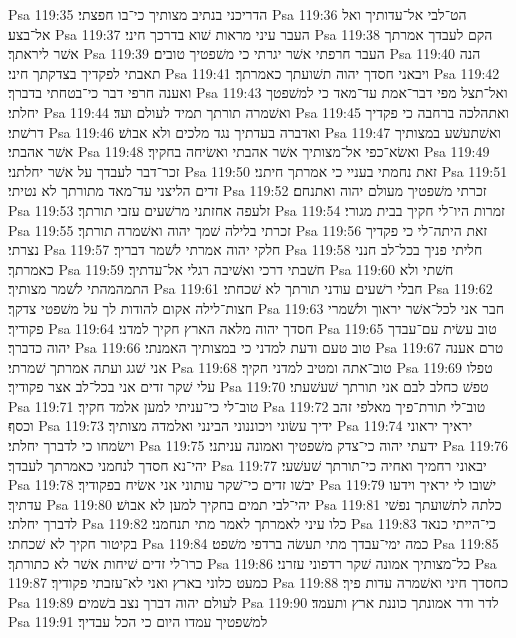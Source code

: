Psa 119:35  הדריכני בנתיב מצותיך כי־בו חפצתי׃
Psa 119:36  הט־לבי אל־עדותיך ואל אל־בצע׃
Psa 119:37  העבר עיני מראות שׁוא בדרכך חיני׃
Psa 119:38  הקם לעבדך אמרתך אשׁר ליראתך׃
Psa 119:39  העבר חרפתי אשׁר יגרתי כי משׁפטיך טובים׃
Psa 119:40  הנה תאבתי לפקדיך בצדקתך חיני׃
Psa 119:41  ויבאני חסדך יהוה תשׁועתך כאמרתך׃
Psa 119:42  ואענה חרפי דבר כי־בטחתי בדברך׃
Psa 119:43  ואל־תצל מפי דבר־אמת עד־מאד כי למשׁפטך יחלתי׃
Psa 119:44  ואשׁמרה תורתך תמיד לעולם ועד׃
Psa 119:45  ואתהלכה ברחבה כי פקדיך דרשׁתי׃
Psa 119:46  ואדברה בעדתיך נגד מלכים ולא אבושׁ׃
Psa 119:47  ואשׁתעשׁע במצותיך אשׁר אהבתי׃
Psa 119:48  ואשׂא־כפי אל־מצותיך אשׁר אהבתי ואשׂיחה בחקיך׃
Psa 119:49  זכר־דבר לעבדך על אשׁר יחלתני׃
Psa 119:50  זאת נחמתי בעניי כי אמרתך חיתני׃
Psa 119:51  זדים הליצני עד־מאד מתורתך לא נטיתי׃
Psa 119:52  זכרתי משׁפטיך מעולם יהוה ואתנחם׃
Psa 119:53  זלעפה אחזתני מרשׁעים עזבי תורתך׃
Psa 119:54  זמרות היו־לי חקיך בבית מגורי׃
Psa 119:55  זכרתי בלילה שׁמך יהוה ואשׁמרה תורתך׃
Psa 119:56  זאת היתה־לי כי פקדיך נצרתי׃
Psa 119:57  חלקי יהוה אמרתי לשׁמר דבריך׃
Psa 119:58  חליתי פניך בכל־לב חנני כאמרתך׃
Psa 119:59  חשׁבתי דרכי ואשׁיבה רגלי אל־עדתיך׃
Psa 119:60  חשׁתי ולא התמהמהתי לשׁמר מצותיך׃
Psa 119:61  חבלי רשׁעים עודני תורתך לא שׁכחתי׃
Psa 119:62  חצות־לילה אקום להודות לך על משׁפטי צדקך׃
Psa 119:63  חבר אני לכל־אשׁר יראוך ולשׁמרי פקודיך׃
Psa 119:64  חסדך יהוה מלאה הארץ חקיך למדני׃
Psa 119:65  טוב עשׂית עם־עבדך יהוה כדברך׃
Psa 119:66  טוב טעם ודעת למדני כי במצותיך האמנתי׃
Psa 119:67  טרם אענה אני שׁגג ועתה אמרתך שׁמרתי׃
Psa 119:68  טוב־אתה ומטיב למדני חקיך׃
Psa 119:69  טפלו עלי שׁקר זדים אני בכל־לב אצר פקודיך׃
Psa 119:70  טפשׁ כחלב לבם אני תורתך שׁעשׁעתי׃
Psa 119:71  טוב־לי כי־עניתי למען אלמד חקיך׃
Psa 119:72  טוב־לי תורת־פיך מאלפי זהב וכסף׃
Psa 119:73  ידיך עשׂוני ויכוננוני הבינני ואלמדה מצותיך׃
Psa 119:74  יראיך יראוני וישׂמחו כי לדברך יחלתי׃
Psa 119:75  ידעתי יהוה כי־צדק משׁפטיך ואמונה עניתני׃
Psa 119:76  יהי־נא חסדך לנחמני כאמרתך לעבדך׃
Psa 119:77  יבאוני רחמיך ואחיה כי־תורתך שׁעשׁעי׃
Psa 119:78  יבשׁו זדים כי־שׁקר עותוני אני אשׂיח בפקודיך׃
Psa 119:79  ישׁובו לי יראיך וידעו עדתיך׃
Psa 119:80  יהי־לבי תמים בחקיך למען לא אבושׁ׃
Psa 119:81  כלתה לתשׁועתך נפשׁי לדברך יחלתי׃
Psa 119:82  כלו עיני לאמרתך לאמר מתי תנחמני׃
Psa 119:83  כי־הייתי כנאד בקיטור חקיך לא שׁכחתי׃
Psa 119:84  כמה ימי־עבדך מתי תעשׂה ברדפי משׁפט׃
Psa 119:85  כרו־לי זדים שׁיחות אשׁר לא כתורתך׃
Psa 119:86  כל־מצותיך אמונה שׁקר רדפוני עזרני׃
Psa 119:87  כמעט כלוני בארץ ואני לא־עזבתי פקודיך׃
Psa 119:88  כחסדך חיני ואשׁמרה עדות פיך׃
Psa 119:89  לעולם יהוה דברך נצב בשׁמים׃
Psa 119:90  לדר ודר אמונתך כוננת ארץ ותעמד׃
Psa 119:91  למשׁפטיך עמדו היום כי הכל עבדיך׃
